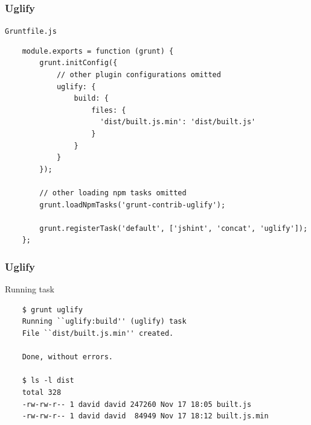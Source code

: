 \begin{frame}[fragile]
  \frametitle{Uglify}

  \begin{block}{\texttt{Gruntfile.js}}
    {\tiny
    \begin{verbatim}
    module.exports = function (grunt) {
        grunt.initConfig({
            // other plugin configurations omitted
            uglify: {
                build: {
                    files: {
                      'dist/built.js.min': 'dist/built.js'
                    }
                }
            }
        });

        // other loading npm tasks omitted
        grunt.loadNpmTasks('grunt-contrib-uglify');

        grunt.registerTask('default', ['jshint', 'concat', 'uglify']);
    };
    \end{verbatim}
    }
  \end{block}
\end{frame}

\begin{frame}[fragile]
  \frametitle{Uglify}

  \begin{block}{Running task}
    {\tiny
    \begin{verbatim}
    $ grunt uglify
    Running ``uglify:build'' (uglify) task
    File ``dist/built.js.min'' created.

    Done, without errors.

    $ ls -l dist
    total 328
    -rw-rw-r-- 1 david david 247260 Nov 17 18:05 built.js
    -rw-rw-r-- 1 david david  84949 Nov 17 18:12 built.js.min
    \end{verbatim}
    }
  \end{block}
\end{frame}
